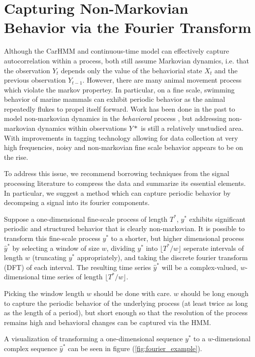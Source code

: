 
\section{Capturing Non-Markovian Behavior via the Fourier Transform}

Although the CarHMM and continuous-time model can effectively capture autocorrelation within a process, both still assume Markovian dynamics, i.e. that the observation $Y_t$ depends only the value of the behaviorial state $X_t$ and the previous observation $Y_{t-1}$. However, there are many animal movement process which violate the markov propertey. In particular, on a fine scale, swimming behavior of marine mammals can exhibit periodic behavior as the animal repeatedly flukes to propel itself forward. Work has been done in the past to model non-markovian dynamics in the \textit{behavioral} process \cite{Langrock:2012}, but addressing non-markovian dynamics within observations $Y*$ is still a relatively unstudied area. With improvements in tagging technology allowing for data collection at very high frequencies, noisy and non-markovian fine scale behavior appears to be on the rise.

To address this issue, we recommend borrowing techniques from the signal processing literature to compress the data and summarize its essential elements. In particular, we suggest a method which can capture periodic behavior by decompsing a signal into its fourier components.

Suppose a one-dimensional fine-scale process of length $T^*$, $y^*$ exhibits significant periodic and structured behavior that is clearly non-markovian. It is possible to transform this fine-scale process $y^*$ to a shorter, but higher dimensional process $\hat y^*$ by selecting a window of size $w$, dividing $y^*$ into $\lfloor T^* / w \rfloor$ seperate intervals of length $w$ (truncating $y^*$ appropriately), and taking the discrete fourier transform (DFT) of each interval. The resulting time series $\hat y^*$ will be a complex-valued, $w$-dimensional time series of length $\lfloor T^* / w \rfloor$.  

Picking the window length $w$ should be done with care. $w$ should be long enough to capture the periodic behavior of the underlying process (at least twice as long as the length of a period), but short enough so that the resolution of the process remains high and behavioral changes can be captured via the HMM.

A visualization of transforming a one-dimensional sequence $y^*$ to a $w$-dimensional complex sequence $\hat y^*$ can be seen in figure (\ref{fig:fourier_example}).